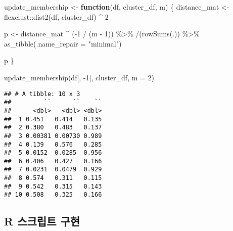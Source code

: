 \documentclass[
]{book}
\newenvironment{Shaded}{\begin{snugshade}}{\end{snugshade}}
\newcommand{\AttributeTok}[1]{\textcolor[rgb]{0.77,0.63,0.00}{#1}}
\newcommand{\ControlFlowTok}[1]{\textcolor[rgb]{0.13,0.29,0.53}{\textbf{#1}}}
\newcommand{\DecValTok}[1]{\textcolor[rgb]{0.00,0.00,0.81}{#1}}
\newcommand{\FunctionTok}[1]{\textcolor[rgb]{0.00,0.00,0.00}{#1}}
\newcommand{\NormalTok}[1]{#1}
\newcommand{\OtherTok}[1]{\textcolor[rgb]{0.56,0.35,0.01}{#1}}
\newcommand{\SpecialCharTok}[1]{\textcolor[rgb]{0.00,0.00,0.00}{#1}}
\newcommand{\StringTok}[1]{\textcolor[rgb]{0.31,0.60,0.02}{#1}}
\begin{document}
\begin{Shaded}
\begin{Highlighting}[]
\NormalTok{update\_membership }\OtherTok{\textless{}{-}} \ControlFlowTok{function}\NormalTok{(df, cluster\_df, m) \{}
\NormalTok{  distance\_mat }\OtherTok{\textless{}{-}}\NormalTok{ flexclust}\SpecialCharTok{::}\FunctionTok{dist2}\NormalTok{(df, cluster\_df)  }\SpecialCharTok{\^{}} \DecValTok{2}
  
\NormalTok{  p }\OtherTok{\textless{}{-}}\NormalTok{ distance\_mat }\SpecialCharTok{\^{}}\NormalTok{ (}\SpecialCharTok{{-}}\DecValTok{1} \SpecialCharTok{/}\NormalTok{ (m }\SpecialCharTok{{-}} \DecValTok{1}\NormalTok{)) }\SpecialCharTok{\%\textgreater{}\%}
    \StringTok{\textasciigrave{}}\AttributeTok{/}\StringTok{\textasciigrave{}}\NormalTok{(}\FunctionTok{rowSums}\NormalTok{(.)) }\SpecialCharTok{\%\textgreater{}\%}
    \FunctionTok{as\_tibble}\NormalTok{(}\AttributeTok{.name\_repair =} \StringTok{"minimal"}\NormalTok{)}
  
\NormalTok{  p}
\NormalTok{\}}

\FunctionTok{update\_membership}\NormalTok{(df[, }\SpecialCharTok{{-}}\DecValTok{1}\NormalTok{], cluster\_df, }\AttributeTok{m =} \DecValTok{2}\NormalTok{)}
\end{Highlighting}
\end{Shaded}

\begin{verbatim}
## # A tibble: 10 x 3
##         ``      ``    ``
##      <dbl>   <dbl> <dbl>
##  1 0.451   0.414   0.135
##  2 0.380   0.483   0.137
##  3 0.00381 0.00730 0.989
##  4 0.139   0.576   0.285
##  5 0.0152  0.0285  0.956
##  6 0.406   0.427   0.166
##  7 0.0231  0.0479  0.929
##  8 0.574   0.311   0.115
##  9 0.542   0.315   0.143
## 10 0.508   0.325   0.166
\end{verbatim}

\hypertarget{fuzzy-kmeans-script-implement}{%
\subsection{R 스크립트 구현}\label{fuzzy-kmeans-script-implement}}
\end{document}
